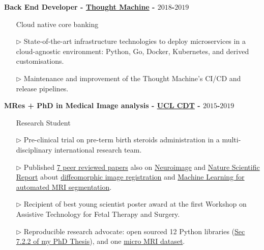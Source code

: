 \documentclass[margin,line]{resume}
\begin{document}
\begin{resume}
{\bf Back End Developer - \href{https://www.thoughtmachine.net/}{Thought Machine} - $2018$-$2019$}
\vspace{0.1cm}
\begin{itemize}
    \item[] \hspace{-1.0cm} Cloud native core banking
    \item[$\triangleright$] State-of-the-art infrastructure technologies to deploy microservices in a cloud-agnostic environment: Python, Go, Docker, Kubernetes, and derived customisations.
    \item[$\triangleright$] Maintenance and improvement of the Thought Machine's CI/CD and release pipelines.
\end{itemize}


{\bf MRes + PhD in Medical Image analysis - \href{https://www.ucl.ac.uk/medical-physics-biomedical-engineering/study/postgraduate-research/medical-imaging-mres-mphilphd}{UCL CDT} - $2015$-$2019$} 
\vspace{0.1cm}
\begin{itemize}
    \item[] \hspace{-1.0cm} Research Student
    \item[$\triangleright$] Pre-clinical trial on pre-term birth steroids administration in a multi-disciplinary international research team.
    \item[$\triangleright$] Published \href{https://scholar.google.com/citations?user=1tAeAI0AAAAJ&hl=en}{7 peer reviewed papers} also on \href{https://www.sciencedirect.com/science/article/pii/S1053811918305366?via%3Dihub}{Neuroimage} and \href{https://www.nature.com/articles/s41598-019-39922-8}{Nature Scientific Report} about \href{https://www.cv-foundation.org/openaccess/content_cvpr_2016_workshops/w15/papers/Ferraris_Accurate_Small_Deformation_CVPR_2016_paper.pdf}{diffeomorphic image registration} and \href{https://www.sciencedirect.com/science/article/pii/S1053811918305366?via%3Dihub}{Machine Learning for automated MRI segmentation}.
    \item[$\triangleright$] Recipient of best young scientist poster award at the first Workshop on Assistive Technology for Fetal Therapy and Surgery.
    \item[$\triangleright$] Reproducible research advocate: open sourced 12 Python libraries (\href{https://discovery.ucl.ac.uk/id/eprint/10072833/}{Sec 7.2.2 of my PhD Thesis}), and one \href{https://zenodo.org/record/1289776}{micro MRI dataset}.
\end{itemize}



\end{resume}
\end{document}
